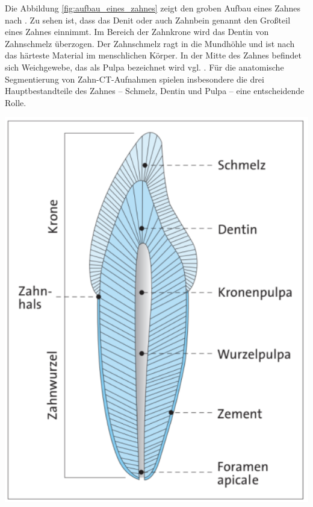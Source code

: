 \begin{minipage}{0.40\textwidth}
	Die Abbildung \ref{fig:aufbau_eines_zahnes} zeigt den groben Aufbau eines Zahnes
	nach \citet[S.~17]{lehmann2012Zahnheilkunde}. Zu sehen ist, dass das Denit
	oder auch Zahnbein genannt den Großteil eines Zahnes einnimmt. Im Bereich der Zahnkrone
	wird das Dentin von Zahnschmelz überzogen. Der Zahnschmelz ragt in die
	Mundhöhle und ist nach \citet[S.~41]{lehmann2012Zahnheilkunde} das härteste Material
	im menschlichen Körper. In der Mitte des Zahnes befindet sich Weichgewebe, das
	als Pulpa bezeichnet wird vgl. \citep[vgl.][S.~15]{lehmann2012Zahnheilkunde}.
	Für die anatomische Segmentierung von Zahn-\ac{CT}-Aufnahmen spielen insbesondere
	die drei Hauptbestandteile des Zahnes – Schmelz, Dentin und Pulpa – eine
	entscheidende Rolle.
\end{minipage}
\hfill
\begin{minipage}{0.50\textwidth}
	\centering
	\includegraphics[scale=0.50]{img/aufbau_eines_zahns.jpg}
	\label{fig:aufbau_eines_zahnes}
\end{minipage}

